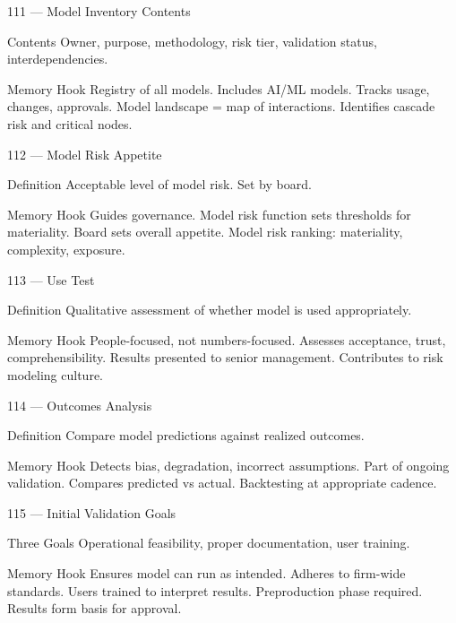 \documentclass[aspectratio=169,8pt]{beamer}
\begin{document}
	\begin{frame}{111 --- Model Inventory Contents}
		\begin{block}{Contents}
			Owner, purpose, methodology, risk tier, validation status, interdependencies.
		\end{block}
		\begin{block}{Memory Hook}
			Registry of all models. Includes AI/ML models. Tracks usage, changes, approvals. Model landscape = map of interactions. Identifies cascade risk and critical nodes.
		\end{block}
	\end{frame}
	
	\begin{frame}{112 --- Model Risk Appetite}
		\begin{block}{Definition}
			Acceptable level of model risk. Set by board.
		\end{block}
		\begin{block}{Memory Hook}
			Guides governance. Model risk function sets thresholds for materiality. Board sets overall appetite. Model risk ranking: materiality, complexity, exposure.
		\end{block}
	\end{frame}
	
	\begin{frame}{113 --- Use Test}
		\begin{block}{Definition}
			Qualitative assessment of whether model is used appropriately.
		\end{block}
		\begin{block}{Memory Hook}
			People-focused, not numbers-focused. Assesses acceptance, trust, comprehensibility. Results presented to senior management. Contributes to risk modeling culture.
		\end{block}
	\end{frame}
	
	\begin{frame}{114 --- Outcomes Analysis}
		\begin{block}{Definition}
			Compare model predictions against realized outcomes.
		\end{block}
		\begin{block}{Memory Hook}
			Detects bias, degradation, incorrect assumptions. Part of ongoing validation. Compares predicted vs actual. Backtesting at appropriate cadence.
		\end{block}
	\end{frame}
	
	\begin{frame}{115 --- Initial Validation Goals}
		\begin{block}{Three Goals}
			Operational feasibility, proper documentation, user training.
		\end{block}
		\begin{block}{Memory Hook}
			Ensures model can run as intended. Adheres to firm-wide standards. Users trained to interpret results. Preproduction phase required. Results form basis for approval.
		\end{block}
	\end{frame}
	
\end{document}
